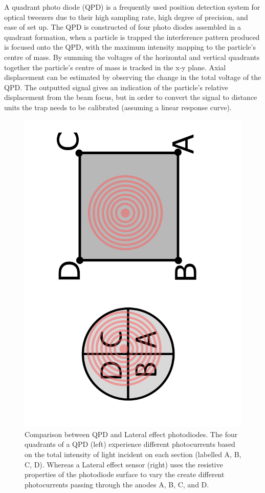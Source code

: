 A quadrant photo diode (QPD) is a frequently used position detection 
system for optical tweezers due to their high sampling rate, high 
degree of precision, and ease of set up. The QPD is constructed of 
four photo diodes assembled in a quadrant formation, when a particle 
is trapped the interference pattern produced is focused onto the QPD, 
with the maximum intensity mapping to the particle's centre of mass. 
By summing the voltages of the horizontal and vertical quadrants together 
the particle's centre of mass is tracked in the x-y plane. Axial 
displacement can be estimated by observing the change in the total 
voltage of the QPD. The outputted signal gives an indication of the 
particle's relative displacement from the beam focus, but in order to 
convert the signal to distance units the trap needs to be calibrated 
(assuming a linear response curve).
\begin{figure}[h!]
	\centering
	\includegraphics[height=\linewidth, angle=270]{QPD_Lateral_effect.pdf}
	\caption{Comparison between QPD and Lateral effect photodiodes.
	The four quadrants of a QPD (left) experience different photocurrents
	based on the total intensity of light incident on each section 
	(labelled A, B, C, D). 
	Whereas a Lateral effect sensor (right) uses the resistive properties
	of the photodiode surface to vary the create different photocurrents 
	passing through the anodes A, B, C, and D.}
\end{figure}

